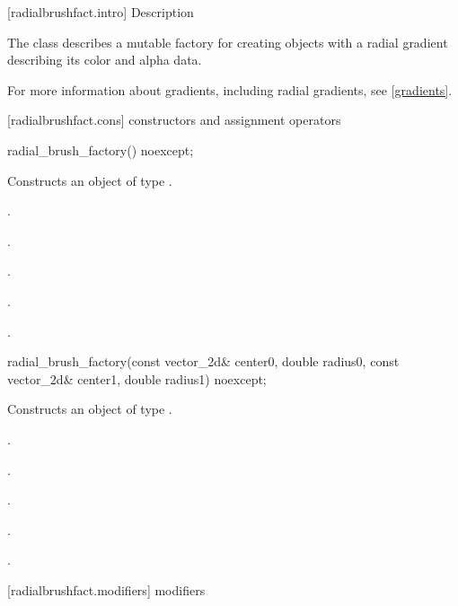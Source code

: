  [radialbrushfact.intro] { Description}

\pnum
{}
The class  describes a mutable factory for creating  objects with a radial gradient describing its color and alpha data.

\pnum
For more information about gradients, including radial gradients, see \ref{gradients}.

 [radialbrushfact.cons] { constructors and assignment operators}

\begin{itemdecl}
radial_brush_factory() noexcept;
\end{itemdecl}
\begin{itemdescr}
\pnum
\effects
Constructs an object of type .

\pnum
\postconditions
{}.

\pnum
{}.

\pnum
{}.
	
\pnum
{}.

\pnum
{}.
\end{itemdescr}

\begin{itemdecl}
radial_brush_factory(const vector_2d& center0, double radius0,
  const vector_2d& center1, double radius1) noexcept;
\end{itemdecl}
\begin{itemdescr}
\pnum
\effects
Constructs an object of type .

\pnum
\postconditions
{}.

\pnum
{}.

\pnum
{}.

\pnum
{}.

\pnum
{}.
\end{itemdescr}

 [radialbrushfact.modifiers] { modifiers}

